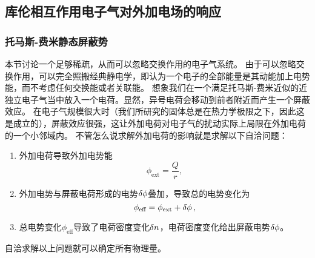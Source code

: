 \documentclass[hyperref, UTF8, a4paper]{ctexart}
\begin{document}
\subsection{库伦相互作用电子气对外加电场的响应}\label{sec:ext-e}

\subsubsection{托马斯-费米静态屏蔽势}

本节讨论一个足够稀疏，从而可以忽略交换作用的电子气系统。
由于可以忽略交换作用，可以完全照搬经典静电学，即认为一个电子的全部能量是其动能加上电势能，而不考虑任何交换能或者关联能。
想象我们在一个满足托马斯-费米近似的近独立电子气当中放入一个电荷。显然，异号电荷会移动到前者附近而产生一个屏蔽效应。
在电子气规模很大时（我们所研究的固体总是在热力学极限之下，因此这是成立的），屏蔽效应很强，这让外加电荷对电子气的扰动实际上局限在外加电荷的一个小邻域内。
不管怎么说求解外加电荷的影响就是求解以下自洽问题：
\begin{enumerate}
    \item 外加电荷导致外加电势能
    \begin{equation}
        \phi_\text{ext} = \frac{Q}{r},
    \end{equation}
    \item 外加电势与屏蔽电荷形成的电势$\var{\phi}$叠加，导致总的电势变化为
    \begin{equation}
        \phi_\text{eff} = \phi_\text{ext} + \var{\phi},
    \end{equation}
    \item 总电势变化$\phi_\text{eff}$导致了电荷密度变化$\var{n}$，电荷密度变化给出屏蔽电势$\var{\phi}$。
\end{enumerate}
自洽求解以上问题就可以确定所有物理量。
\end{document}
